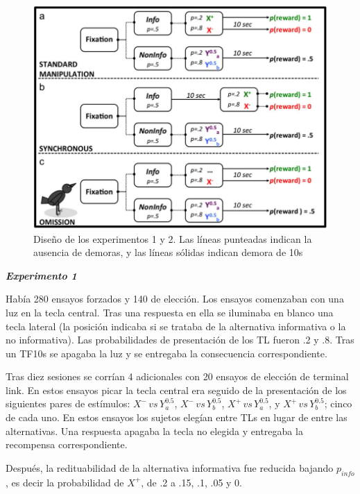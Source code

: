 \documentclass[a4paper,12pt]{article}
\begin{document}
\begin{figure}[ht]
	\begin{center}
		\includegraphics[scale=0.5]{Vasconcelos2015.png}
		\caption{Diseño de los experimentos 1 y 2. Las líneas punteadas indican la ausencia de demoras, y las líneas sólidas indican demora de 10s}
	\end{center}
\end{figure}


{\itshape\bfseries Experimento 1}

Había 280 ensayos forzados y 140 de elección. Los ensayos comenzaban con una luz en la tecla central. Tras una respuesta en ella se iluminaba en blanco una tecla lateral (la posición indicaba si se trataba de la alternativa informativa o la no informativa). Las probabilidades de presentación de los TL fueron .2 y .8. Tras un TF10s se apagaba la luz y se entregaba la consecuencia correspondiente.

Tras diez sesiones se corrían 4 adicionales con 20 ensayos de elección de terminal link. En estos ensayos picar la tecla central era seguido de la presentación de los siguientes pares de estímulos: $X^-\,vs\,Y^{0{.}5}_a$, $X^-\,vs\,Y^{0{.}5}_b$, $X^+\,vs\,Y^{0{.}5}_a$, y $X^+\,vs\,Y^{0{.}5}_b$; cinco de cada uno. En estos ensayos los sujetos elegían entre TLs en lugar de entre las alternativas. Una respuesta apagaba la tecla no elegida y entregaba la recompensa correspondiente.

Después, la redituabilidad de la alternativa informativa fue reducida bajando $p_{info}$, es decir la probabilidad de $X^+$, de .2 a .15, .1, .05 y 0.
\end{document}
